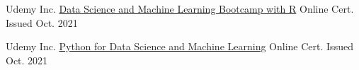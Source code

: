 


\begin{cventries}


  \cventry
    {Udemy Inc.}%
     {\href{https://udemy-certificate.s3.amazonaws.com/pdf/UC-4251979b-17bd-4bb6-9f18-e5f2f8eceb36.pdf}{Data Science and Machine Learning Bootcamp with R}} %
    {Online Cert.} %
    {Issued Oct. 2021} %
    {}
    
  \cventry
    {Udemy Inc.} %
    {\href{https://udemy-certificate.s3.amazonaws.com/pdf/UC-0ade575c-fbe4-40b9-b29f-eb26c1330782.pdf}{Python for Data Science and Machine Learning}} %
    {Online Cert.} %
    {Issued Oct. 2021} %
    {}
    


\end{cventries}
